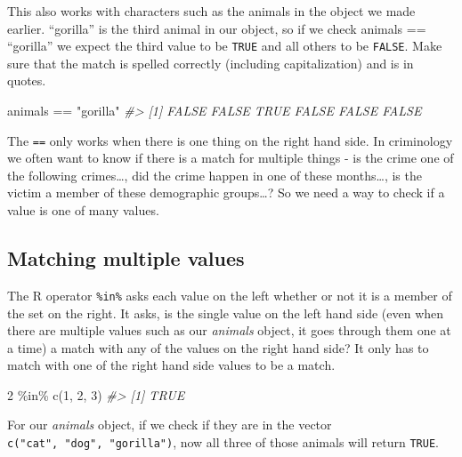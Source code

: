 \documentclass[
]{krantz}
\makeatletter
\newenvironment{Shaded}{\begin{snugshade}}{\end{snugshade}}
\newcommand{\CommentTok}[1]{\textcolor[rgb]{0.37,0.37,0.37}{\textit{#1}}}
\newcommand{\DecValTok}[1]{\textcolor[rgb]{0.06,0.06,0.06}{#1}}
\newcommand{\FunctionTok}[1]{\textcolor[rgb]{0,0,0}{#1}}
\newcommand{\NormalTok}[1]{#1}
\newcommand{\SpecialCharTok}[1]{\textcolor[rgb]{0,0,0}{#1}}
\newcommand{\StringTok}[1]{\textcolor[rgb]{0.5,0.5,0.5}{#1}}
\newenvironment{kframe}{%
\medskip{}
\setlength{\fboxsep}{.8em}
 \def\at@end@of@kframe{}%
 \ifinner\ifhmode%
  \def\at@end@of@kframe{\end{minipage}}%
  \begin{minipage}{\columnwidth}%
 \fi\fi%
 \def\FrameCommand##1{\hskip\@totalleftmargin \hskip-\fboxsep
 \colorbox{shadecolor}{##1}\hskip-\fboxsep
     \hskip-\linewidth \hskip-\@totalleftmargin \hskip\columnwidth}%
 \MakeFramed {\advance\hsize-\width
   \@totalleftmargin\z@ \linewidth\hsize
   \@setminipage}}%
 {\par\unskip\endMakeFramed%
 \at@end@of@kframe}
\renewenvironment{Shaded}{\begin{kframe}}{\end{kframe}}
\makeatother
\begin{document}
This also works with characters such as the animals in the object we made earlier. ``gorilla'' is the third animal in our object, so if we check animals == ``gorilla'' we expect the third value to be \texttt{TRUE} and all others to be \texttt{FALSE}. Make sure that the match is spelled correctly (including capitalization) and is in quotes.

\begin{Shaded}
\begin{Highlighting}[]
\NormalTok{animals }\SpecialCharTok{==} \StringTok{"gorilla"}
\CommentTok{\#\textgreater{} [1] FALSE FALSE  TRUE FALSE FALSE FALSE}
\end{Highlighting}
\end{Shaded}

The \texttt{==} only works when there is one thing on the right hand side. In criminology we often want to know if there is a match for multiple things - is the crime one of the following crimes\ldots, did the crime happen in one of these months\ldots, is the victim a member of these demographic groups\ldots? So we need a way to check if a value is one of many values.

\hypertarget{matching-multiple-values}{%
\subsection{Matching multiple values}\label{matching-multiple-values}}

The R operator \texttt{\%in\%} asks each value on the left whether or not it is a member of the set on the right. It asks, is the single value on the left hand side (even when there are multiple values such as our \emph{animals} object, it goes through them one at a time) a match with any of the values on the right hand side? It only has to match with one of the right hand side values to be a match.

\begin{Shaded}
\begin{Highlighting}[]
\DecValTok{2} \SpecialCharTok{\%in\%} \FunctionTok{c}\NormalTok{(}\DecValTok{1}\NormalTok{, }\DecValTok{2}\NormalTok{, }\DecValTok{3}\NormalTok{) }
\CommentTok{\#\textgreater{} [1] TRUE}
\end{Highlighting}
\end{Shaded}

For our \emph{animals} object, if we check if they are in the vector \texttt{c("cat",\ "dog",\ "gorilla")}, now all three of those animals will return \texttt{TRUE}.
\end{document}
